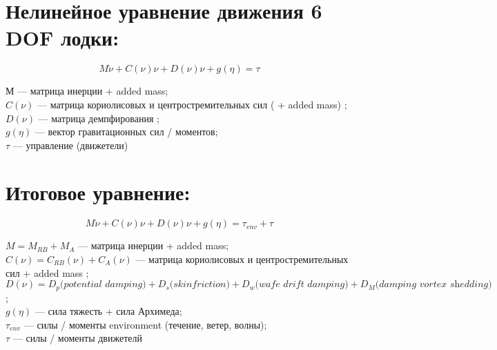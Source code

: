 \section*{Нелинейное уравнение движения 6 DOF лодки:}

\begin{equation*}
    M \Dot{{\nu}} + C({\nu}){\nu} + D({\nu}){\nu} + g({\eta}) = \tau
\end{equation*}

М --- матрица инерции + added mass; \\

${C({\nu})}$ --- матрица кориолисовых и центростремительных сил ( + added mass) ; \\

${D({\nu})}$ --- матрица демпфирования ; \\

${g({\eta})}$ --- вектор гравитационных сил / моментов; \\

${ \tau}$ --- управление (движетели) 


\section*{Итоговое уравнение:}

\begin{equation*}
    M \Dot{{\nu}} + C({\nu}){\nu} + D({\nu}){\nu} + g({\eta}) = \tau_{env} + \tau
\end{equation*}

${M = M_{RB} + M_A}$ --- матрица инерции + added mass; \\

${C({\nu}) = C_{RB}({\nu}) + C_A({\nu})      }$ --- матрица кориолисовых и центростремительных сил + added mass ; \\

${D({\nu}) = D_p \textit{(potential damping)} + D_s \textit{(skinfriction)} + D_w \textit{(wafe drift damping)} + D_M \textit{(damping vortex shedding)}      }$; \\

${g({\eta})}$ --- сила тяжесть + сила Архимеда; \\

${ \tau_{env}}$ --- силы / моменты environment (течение, ветер, волны); \\

${ \tau}$ --- силы / моменты движетелй